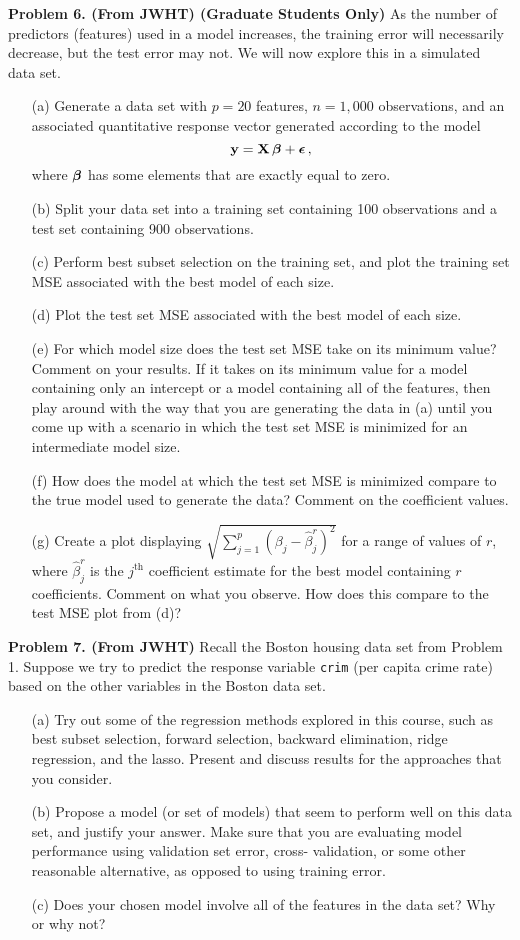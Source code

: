 \documentclass[11pt]{report}
\newcommand{\bfmath}[1]{\mbox{\boldmath$#1$\unboldmath}}
\begin{document}
\noindent
{\bf Problem 6. (From JWHT) (Graduate Students Only)} As the number of predictors (features) used in a model increases, the training error will necessarily decrease, but the test error may not. We will now explore this in a simulated data set.
\begin{itemize}
\item[(a) ] Generate a data set with $p = 20$ features, $n = 1,000$ observations, and an associated quantitative response vector generated according to the model
$$\mathbf{y}=\mathbf{X}\,\bfmath{\beta}+\bfmath{\epsilon}\,,$$
where $\bfmath{\beta}$ has some elements that are exactly equal to zero. 
\item[(b) ] Split your data set into a training set containing 100 observations and a test set containing 900 observations.
\item[(c) ] Perform best subset selection on the training set, and plot the training set MSE associated with the best model of each size.
\item[(d) ] Plot the test set MSE associated with the best model of each size.
\item[(e) ] For which model size does the test set MSE take on its minimum value? Comment on your results. If it takes on its minimum value for a model containing only an intercept or a model containing all of the features, then play around with the way that you are generating the data in (a) until you come up with a scenario in which the test set MSE is minimized for an intermediate model size.
\item[(f) ] How does the model at which the test set MSE is minimized compare to the true model used to generate the data? Comment on the coefficient values.
\item[(g) ] Create a plot displaying $\sqrt{\sum\limits_{j=1}^p(\beta_j-\widehat{\beta}_j^r)^2}$ for a range of values of $r$, where $\widehat{\beta}_j^r$ is the $j^\text{th}$ coefficient estimate for the best model containing $r$ coefficients. Comment on what you observe. How does this compare to the test MSE plot from (d)?
\end{itemize}

\noindent
{\bf Problem 7. (From JWHT)} Recall the Boston housing data set from Problem 1. Suppose we try to predict the response variable {\tt crim} (per capita crime rate) based on the other variables in the Boston data set.
\begin{itemize}
\item[(a) ] Try out some of the regression methods explored in this course, such as best subset selection, forward selection, backward elimination, ridge regression, and the lasso. Present and discuss results for the approaches that you consider.
\item[(b) ] Propose a model (or set of models) that seem to perform well on this data set, and justify your answer. Make sure that you are evaluating model performance using validation set error, cross- validation, or some other reasonable alternative, as opposed to using training error.
\item[(c) ] Does your chosen model involve all of the features in the data set? Why or why not?
\end{itemize}
\end{document}
